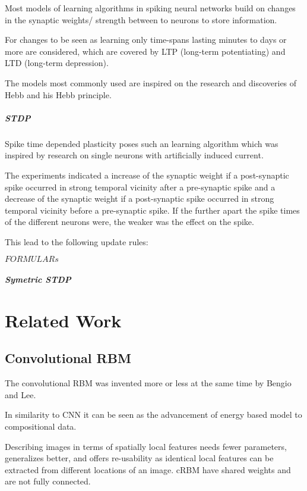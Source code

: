 Most models of learning algorithms in spiking neural networks build on changes in the synaptic weights/ strength between to neurons to store information.

For changes to be seen as learning only time-spans lasting minutes to days or more are considered, which are covered by LTP (long-term potentiating) and LTD (long-term depression).
 
The models most commonly used are inspired on the research and discoveries of Hebb and his Hebb principle.

\paragraph{STDP}

Spike time depended plasticity poses such an learning algorithm which was inspired by research on single neurons with artificially induced current.

The experiments indicated a increase of the synaptic weight if a post-synaptic spike occurred in strong temporal vicinity after a pre-synaptic spike and a decrease of the synaptic weight if a post-synaptic spike occurred in strong temporal vicinity before a pre-synaptic spike.
If the further apart the spike times of the different neurons were, the weaker was the effect on the spike.

This lead to the following update rules:

$FORMULARs$

     

\paragraph{Symetric STDP}



\chapter{Related Work}
\section{Convolutional RBM}

The convolutional RBM was invented more or less at the same time by Bengio and Lee. 

In similarity to CNN it can be seen as the advancement of energy based model to compositional data.

Describing images in terms of spatially local features needs fewer parameters, generalizes better, and offers re-usability as identical local features can be extracted from different locations of an image.
cRBM have shared weights and are not fully connected.



